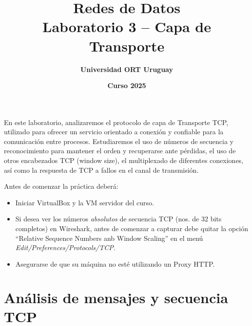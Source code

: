 \documentclass[a4paper,10pt]{article}
\title{\bf Redes de Datos\\Laboratorio 3 -- Capa de Transporte}
\author{\bf Universidad ORT Uruguay}
\date{\bf Curso 2025}
\begin{document}
\maketitle
\thispagestyle{fancy}

En este laboratorio, analizaremos el protocolo de capa de Transporte TCP, utilizado para ofrecer un servicio orientado a conexión y confiable para la comunicación entre procesos. Estudiaremos el uso de números de secuencia y reconocimiento para mantener el orden y recuperarse ante pérdidas, el uso de otros encabezados TCP (window size), el multiplexado de diferentes conexiones, así como la respuesta de TCP a fallos en el canal de transmisión.

Antes de comenzar la práctica deberá:
\begin{itemize}
    \item Iniciar VirtualBox y la VM servidor del curso.
    \item Si desea ver los números \emph{absolutos} de secuencia TCP (nos. de 32 bits completos) en Wireshark, antes de comenzar a capturar debe quitar la opción ``Relative Sequence Numbers anb Window Scaling'' en el menú \emph{Edit/Preferences/Protocols/TCP}.
    \item Asegurarse de que su máquina no esté utilizando un Proxy HTTP.
\end{itemize}

\section{Análisis de mensajes y secuencia TCP}
\end{document}
